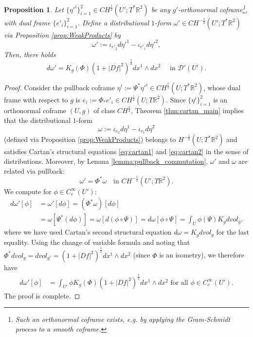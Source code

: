 \documentclass[12pt]{article}
\newcommand{\R}{\mathbb{R}}
\theoremstyle{plain}
\newtheorem{proposition}[theorem]{Proposition}
\numberwithin{equation}{section}
\begin{document}
\begin{proposition} \label{prop:pullback_Cartan}
    Let $\{\eta'^i\}_{i=1}^2 \in CH^\frac12(U';T^*\R^2)$ be any $g'$-orthonormal coframe\footnote{Such an orthonormal coframe exists, e.g. by applying the Gram-Schmidt process to a smooth coframe.}, with dual frame $\{e'_i\}_{i=1}^2$. Define a distributional $1$-form $\omega' \in CH^{-\frac12}(U';T^*\R^2)$ via Proposition \ref{prop:WeakProducts} by
    \begin{equation} \label{eq:def_omegapr}
        \omega' := \iota_{e'_2} d\eta'^1 - \iota_{e'_1} d\eta'^2,
    \end{equation}
    Then, there holds
    \begin{equation}
        d\omega' = K_g(\Phi)(1+|Df|^2)^\frac12 dx^1 \wedge dx^2 \quad \text{ in } \mathcal{D}'(U').
    \end{equation}
\end{proposition}

\begin{proof}
    Consider the pullback coframe $\eta^i := \Psi^*\eta'^i \in CH^\frac12(U;T^*\R^2)$, whose dual frame with respect to $g$ is $e_i := \Phi_*e'_i \in CH^\frac12(U;T\R^2)$. Since $\{\eta^i\}_{i=1}^2$ is an orthonormal coframe $(U,g)$ of class $CH^\frac12$, Theorem \ref{thm:cartan_main} implies that the distributional $1$-form
    \begin{equation*}
        \omega := \iota_{e_2}d\eta^1 - \iota_{e_1}d\eta^2
    \end{equation*}
    (defined via Proposition \ref{prop:WeakProducts}) belongs to $H^{-\frac12}(U;T^*\R^2)$ and satisfies Cartan's structural equations \eqref{eq:cartan1} and \eqref{eq:cartan2} in the sense of distributions. Moreover, by Lemma \ref{lemma:pullback_commutation}, $\omega'$ and $\omega$ are related via pullback:
    \begin{equation*}
        \omega' = \Phi^*\omega \quad \text{in } CH^{-\frac12}(U';T\R^2).
    \end{equation*}
    We compute for $\phi \in C^\infty_c(U')$:
    \begin{align*}
        d\omega'[\phi] 
            &= \omega'[d\phi] 
                =  (\Phi^*\omega)[d\phi]\\
            &= \omega[\Psi^*(d\phi)] 
                = \omega[d(\phi\circ\Psi)] 
                =  d\omega[\phi\circ\Psi]
                = \int_U \phi(\Psi)K_g dvol_g.
    \end{align*}
    where we have used Cartan's second structural equation $d\omega = K_g dvol_g$ for the last equality. Using the change of variable formula and noting that $\Phi^*dvol_g = dvol_{g'} = (1+|Df|^2)^\frac12 dx^1 \wedge dx^2$ (since $\Phi$ is an isometry), we therefore have
     \begin{align*}
        d\omega'[\phi] 
            &= \int_{U'} \phi K_g(\Phi) (1+|Df|^2)^\frac12 dx^1 \wedge dx^2 \text{ for all } \phi \in C_c^\infty(U').
    \end{align*}
    The proof is complete.
\end{proof}
\end{document}
